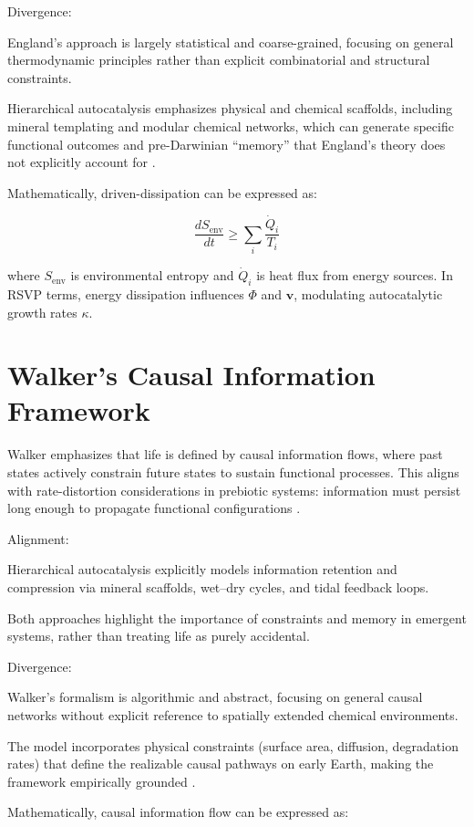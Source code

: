 \documentclass{book}
\begin{document}
Divergence:

England’s approach is largely statistical and coarse-grained, focusing on general thermodynamic principles rather than explicit combinatorial and structural constraints.

Hierarchical autocatalysis emphasizes physical and chemical scaffolds, including mineral templating and modular chemical networks, which can generate specific functional outcomes and pre-Darwinian “memory” that England’s theory does not explicitly account for \citep{vasas2010}.

Mathematically, driven-dissipation can be expressed as:

\[\frac{dS_\text{env}}{dt} \ge \sum_i \frac{\dot{Q}_i}{T_i}\]

where $S_\text{env}$ is environmental entropy and $\dot{Q}_i$ is heat flux from energy sources. In RSVP terms, energy dissipation influences $\Phi$ and $\mathbf{v}$, modulating autocatalytic growth rates $\kappa$.

\section{Walker’s Causal Information Framework}
Walker emphasizes that life is defined by causal information flows, where past states actively constrain future states to sustain functional processes. This aligns with rate-distortion considerations in prebiotic systems: information must persist long enough to propagate functional configurations \citep{walker2013}.

Alignment:

Hierarchical autocatalysis explicitly models information retention and compression via mineral scaffolds, wet–dry cycles, and tidal feedback loops.

Both approaches highlight the importance of constraints and memory in emergent systems, rather than treating life as purely accidental.

Divergence:

Walker’s formalism is algorithmic and abstract, focusing on general causal networks without explicit reference to spatially extended chemical environments.

The model incorporates physical constraints (surface area, diffusion, degradation rates) that define the realizable causal pathways on early Earth, making the framework empirically grounded \citep{walker2017}.

Mathematically, causal information flow can be expressed as:
\end{document}
